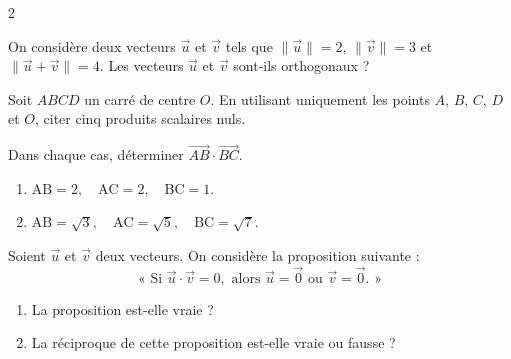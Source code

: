 \documentclass[a4paper,12pt]{article}
\title{
  \centering
  \tcbset{colframe=BlackSav,colback=GrayBG}
  \tcbox[tikznode]{
    Chapitre 7 \\Produit scalaire
  }
}
\author{}
\date{}
\begin{document}
\maketitle

\begin{multicols}{2}

  \begin{exercice}[title=Exercice 1 $\star$ { [Calculer] }]{}{}
    On considère deux vecteurs \(\vec{u}\) et \(\vec{v}\) tels que \(\|\vec{u}\| = 2\), \(\|\vec{v}\| = 3\) et \(\|\vec{u} + \vec{v}\| = 4\).
    Les vecteurs \(\vec{u}\) et \(\vec{v}\) sont-ils orthogonaux ?
  \end{exercice}

  \begin{exercice}[title=Exercice 2 $\star$ { [Représenter] }]{}{}
    Soit \(ABCD\) un carré de centre \(O\).
    En utilisant uniquement les points \(A\), \(B\), \(C\), \(D\) et \(O\), citer cinq produits scalaires nuls.
  \end{exercice}

  \begin{exercice}[title=Exercice 3 $\star$ { [Calculer, Représenter] }]{}{}
    Dans chaque cas, déterminer \(\overrightarrow{AB} \cdot \overrightarrow{BC}\).
    \begin{enumerate}
      \item \(\mathrm{AB} = 2,\quad \mathrm{AC} = 2,\quad \mathrm{BC} = 1.\)
      \item \(\mathrm{AB} = \sqrt{3},\quad \mathrm{AC} = \sqrt{5},\quad \mathrm{BC} = \sqrt{7}.\)
    \end{enumerate}
  \end{exercice}

  \begin{exercice}[title=Exercice 4 $\star$ { [Raisonner] }]{}{}
    Soient \(\vec{u}\) et \(\vec{v}\) deux vecteurs. On considère la proposition suivante :
    \[
      \text{« Si } \vec{u} \cdot \vec{v} = 0,\text{ alors } \vec{u} = \vec{0} \text{ ou } \vec{v} = \vec{0}\text{. »}
    \]
    \begin{enumerate}
      \item La proposition est-elle vraie ?
      \item La réciproque de cette proposition est-elle vraie ou fausse ?
    \end{enumerate}
  \end{exercice}


\end{multicols}
\end{document}

